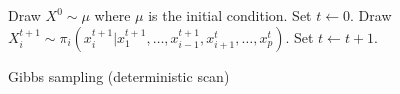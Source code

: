 \begin{algorithm}
\begin{algorithmic}
  \tophrule
  \STATE Draw $X^0\sim\mu$ where $\mu$ is the initial condition.
  \STATE Set $t\leftarrow0$.
  \REPEAT
      \STATE Draw
      $X_i^{t+1} \sim
      \pi_i(x_i^{t+1}|x_1^{t+1},\dots,x_{i-1}^{t+1},x_{i+1}^t,\dots,x_p^t)$.
    \ENDFOR
    \STATE Set $t\leftarrow t+1$.
  \bottomhrule
\end{algorithmic}
\caption{Gibbs sampling (deterministic scan)}
\label{alg:gibbs}
\end{algorithm}
